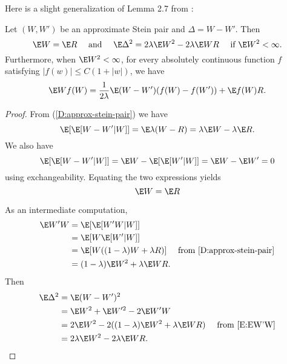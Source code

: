 Here is a slight generalization of Lemma 2.7 from \cite{chen2010normal}:
\begin{lemma}
  Let $(W, W')$ be an approximate Stein pair and $\Delta = W - W'$.  Then
  \begin{equation}
    \E W = \E R \quad \text{ and } \quad \E \Delta^2 = 2 \lambda \E W^2 - 2\lambda \E WR
    \quad \text{ if } \E W^2 < \infty.
  \end{equation}
  Furthermore, when $\E W^2 < \infty$, for every absolutely continuous function $f$ satisfying
  $|f(w)| \leq C(1 + |w|)$, we have
  \begin{equation}
    \label{eq:expectation-w-f(w)}
    \E Wf(W) = \frac{1}{2\lambda} \E (W-W')(f(W)-f(W')) + \E f(W)R.
  \end{equation}
\end{lemma}
\begin{proof}
  From (\ref{D:approx-stein-pair}) we have
  \begin{equation*}
    \E [\E [W-W'|W]] = \E \lambda (W - R) = \lambda \E W - \lambda \E R.
  \end{equation*}
  We also have
  \begin{equation*}
    \E [\E [W-W'|W]] = \E W - \E [\E [W' | W]] = \E W - \E W' = 0
  \end{equation*}
  using exchangeability.  Equating the two expressions yields
  \begin{equation*}
    \E W = \E R
  \end{equation*}

  As an intermediate computation,
  \begin{equation}
    \label{E:EW'W}
    \begin{split}
      \E W'W &= \E [\E [W'W|W]] \\
      &= \E [W \E [W'|W]] \\
      &= \E [W ((1-\lambda)W+\lambda R)] \quad \text{ from } \eqref{D:approx-stein-pair} \\
      &= (1-\lambda)\E W^2 + \lambda \E WR.
    \end{split}
  \end{equation}
  Then
  \begin{equation}
    \begin{split}
      \E \Delta^2 &= \E (W-W')^2 \\
      &= \E W^2 + \E W'^2 - 2\E W'W \\
      &= 2 \E W^2 - 2 ((1-\lambda)\E W^2 + \lambda \E WR) \quad \text{ from } \eqref{E:EW'W}\\
      &= 2 \lambda \E W^2 - 2\lambda \E WR.
    \end{split}
  \end{equation}


\end{proof}
